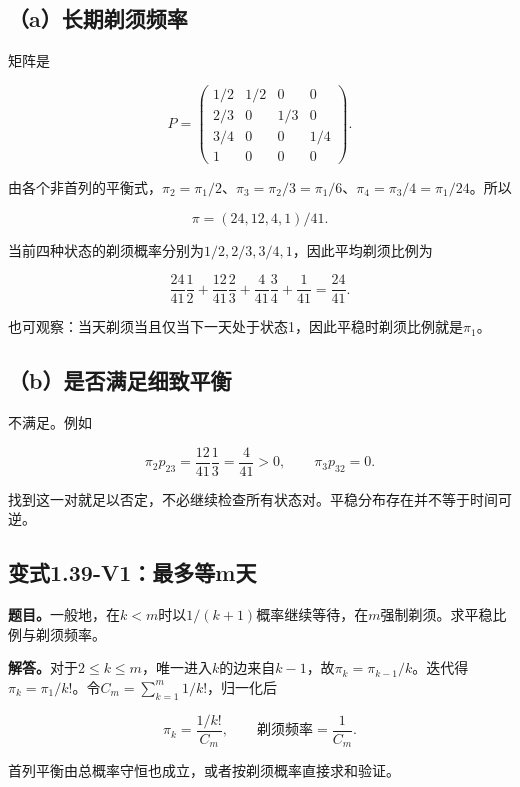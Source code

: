 \documentclass[
  11pt,
  a4paper,
  UTF8,
  fontset=fandol]{ctexart}
\begin{document}
\subsection{（a）长期剃须频率}\label{aux957fux671fux5243ux987bux9891ux7387}

矩阵是

\[
P=\begin{pmatrix}
1/2&1/2&0&0\\2/3&0&1/3&0\\3/4&0&0&1/4\\1&0&0&0
\end{pmatrix}.
\]

由各个非首列的平衡式，\(\pi_2=\pi_1/2\)、\(\pi_3=\pi_2/3=\pi_1/6\)、\(\pi_4=\pi_3/4=\pi_1/24\)。所以

\[
\boxed{\pi=(24,12,4,1)/41.}
\]

当前四种状态的剃须概率分别为\(1/2,2/3,3/4,1\)，因此平均剃须比例为

\[
\frac{24}{41}\frac12+\frac{12}{41}\frac23+
\frac4{41}\frac34+\frac1{41}=\boxed{\frac{24}{41}}.
\]

也可观察：当天剃须当且仅当下一天处于状态1，因此平稳时剃须比例就是\(\pi_1\)。

\subsection{（b）是否满足细致平衡}\label{bux662fux5426ux6ee1ux8db3ux7ec6ux81f4ux5e73ux8861}

不满足。例如

\[
\pi_2p_{23}=\frac{12}{41}\frac13=\frac4{41}>0,
\qquad \pi_3p_{32}=0.
\]

找到这一对就足以否定，不必继续检查所有状态对。平稳分布存在并不等于时间可逆。

\subsection{变式1.39-V1：最多等m天}\label{ux53d8ux5f0f1.39-v1ux6700ux591aux7b49mux5929}

\textbf{题目。}一般地，在\(k<m\)时以\(1/(k+1)\)概率继续等待，在\(m\)强制剃须。求平稳比例与剃须频率。

\textbf{解答。}对于\(2\le k\le m\)，唯一进入\(k\)的边来自\(k-1\)，故\(\pi_k=\pi_{k-1}/k\)。迭代得\(\pi_k=\pi_1/k!\)。令\(C_m=\sum_{k=1}^m1/k!\)，归一化后

\[
\boxed{\pi_k=\frac{1/k!}{C_m},\qquad \text{剃须频率}=\frac1{C_m}.}
\]

首列平衡由总概率守恒也成立，或者按剃须概率直接求和验证。
\end{document}
